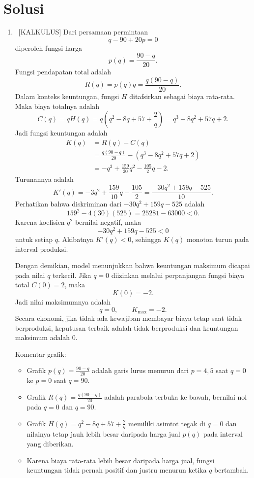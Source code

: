 \documentclass[10pt,a4paper]{article}
\begin{document}
\newpage

\section*{Solusi}

\begin{enumerate}
  \item \ [KALKULUS]
        Dari persamaan permintaan
        \[
          q - 90 + 20p = 0
        \]
        diperoleh fungsi harga
        \[
          p(q) = \frac{90-q}{20}.
        \]
        Fungsi pendapatan total adalah
        \[
          R(q) = p(q)q = \frac{q(90-q)}{20}.
        \]
        Dalam konteks keuntungan, fungsi $H$ ditafsirkan sebagai biaya rata-rata. Maka biaya totalnya adalah
        \[
          C(q) = qH(q)
          = q\left(q^2 - 8q + 57 + \frac{2}{q}\right)
          = q^3 - 8q^2 + 57q + 2.
        \]
        Jadi fungsi keuntungan adalah
        \begin{align*}
          K(q)
          &= R(q) - C(q) \\
          &= \frac{q(90-q)}{20} - \left(q^3 - 8q^2 + 57q + 2\right) \\
          &= -q^3 + \frac{159}{20}q^2 - \frac{105}{2}q - 2.
        \end{align*}
        Turunannya adalah
        \[
          K'(q) = -3q^2 + \frac{159}{10}q - \frac{105}{2}
          = \frac{-30q^2 + 159q - 525}{10}.
        \]
        Perhatikan bahwa diskriminan dari $-30q^2 + 159q - 525$ adalah
        \[
          159^2 - 4(30)(525) = 25281 - 63000 < 0.
        \]
        Karena koefisien $q^2$ bernilai negatif, maka
        \[
          -30q^2 + 159q - 525 < 0
        \]
        untuk setiap $q$. Akibatnya $K'(q) < 0$, sehingga $K(q)$ monoton turun pada interval produksi.

        Dengan demikian, model menunjukkan bahwa keuntungan maksimum dicapai pada nilai $q$ terkecil. Jika $q=0$ diizinkan melalui perpanjangan fungsi biaya total $C(0)=2$, maka
        \[
          K(0)= -2.
        \]
        Jadi nilai maksimumnya adalah
        \[
          \boxed{q=0,\qquad K_{\max}=-2.}
        \]
        Secara ekonomi, jika tidak ada kewajiban membayar biaya tetap saat tidak berproduksi, keputusan terbaik adalah tidak berproduksi dan keuntungan maksimum adalah $0$.

        Komentar grafik:
        \begin{itemize}
          \item Grafik $p(q)=\frac{90-q}{20}$ adalah garis lurus menurun dari $p=4{,}5$ saat $q=0$ ke $p=0$ saat $q=90$.
          \item Grafik $R(q)=\frac{q(90-q)}{20}$ adalah parabola terbuka ke bawah, bernilai nol pada $q=0$ dan $q=90$.
          \item Grafik $H(q)=q^2-8q+57+\frac{2}{q}$ memiliki asimtot tegak di $q=0$ dan nilainya tetap jauh lebih besar daripada harga jual $p(q)$ pada interval yang diberikan.
          \item Karena biaya rata-rata lebih besar daripada harga jual, fungsi keuntungan tidak pernah positif dan justru menurun ketika $q$ bertambah.
        \end{itemize}


\end{enumerate}
\end{document}
